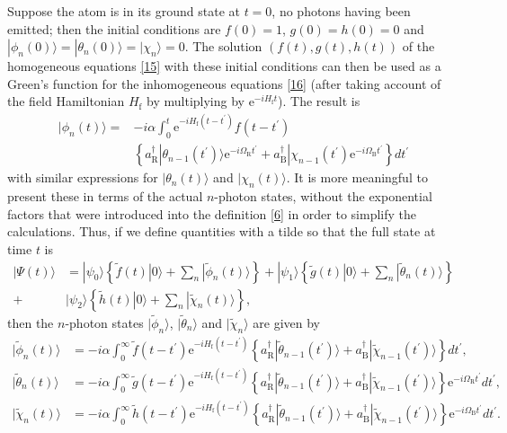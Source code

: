 \documentclass[12pt,a4paper,reqno]{article}
\renewcommand{\(}{\left(}
\renewcommand{\)}{\right)}
\newcommand{\pr}{^\prime}
\newcommand{\e}{\mbox{e}}
\newcommand{\tR}{\text{R}}
\newcommand{\tB}{\text{B}}
\newcommand{\tf}{\text{f}}
\newcommand{\<}{\langle}
\renewcommand{\>}{\rangle}
\theoremstyle{plain} %
\theoremstyle{definition}
\theoremstyle{remark}
\begin{document}
Suppose the atom is in its ground state at $t=0$, no photons having been
emitted; then the initial conditions are $f(0)=1$, $g(0)=h(0)=0$ and
$|\phi_n(0)\> = |\theta_n(0)\> = |\chi_n\> = 0$. The solution
$(f(t),g(t),h(t))$ of the homogeneous equations \eqref{15} with these
initial conditions can then be used as a Green's function for the
inhomogeneous equations \eqref{16} (after taking account of the field
Hamiltonian $H_{\tf}$ by multiplying by $\e^{-iH_{\tf}t}$). The result
is
\begin{equation}
\begin{aligned}\label{17}
|\phi_n(t)\> =& -i\alpha\int_0^t\e^{-iH_{\tf}(t-t\pr)}f(t-t\pr)\\
&\left\{a_{\tR}^\dagger|\theta_{n-1}(t\pr)\>\e^{-i\Omega_{\tR}t\pr}
+ a_{\tB}^\dagger|\chi_{n-1}(t\pr)\e^{-i\Omega_{\tB}t\pr}\right\}dt\pr
\end{aligned}
\end{equation}
with similar expressions for $|\theta_n(t)\>$ and $|\chi_n(t)\>$. It is
more meaningful to present these in terms of the actual $n$-photon
states, without the exponential factors that were introduced into the
definition \eqref{6} in order to simplify the calculations. Thus, if we
define quantities with a tilde so that the full state at time $t$ is 
\begin{equation}
\begin{aligned}
|\Psi(t)\> &=
|\psi_0\>\left\{\tilde{f}(t)|0\> + \sum_n|\tilde{\phi}_n(t)\>\right\} + 
|\psi_1\>\left\{\tilde{g}(t)|0\> + \sum_n|\tilde{\theta}_n(t)\>\right\}\\
+&|\psi_2\>\left\{\tilde{h}(t)|0\> + \sum_n|\tilde{\chi}_n(t)\>\right\},
\end{aligned}
\end{equation}
then the $n$-photon states $|\tilde{\phi}_n\>$, $|\tilde{\theta}_n\>$ and
$|\tilde{\chi}_n\>$ are given by
\begin{equation}
\begin{aligned}\label{19}
|\tilde{\phi}_n(t)\> &=
-i\alpha\int_0^\infty\tilde{f}(t-t\pr)\e^{-iH_{\tf}(t-t\pr)}
\left\{a_{\tR}^\dagger|\tilde{\theta}_{n-1}(t\pr)\> +
a_{\tB}^\dagger|\tilde{\chi}_{n-1}(t\pr)\>\right\}dt\pr,\\
|\tilde{\theta}_n(t)\> &=
-i\alpha\int_0^\infty\tilde{g}(t-t\pr)\e^{-iH_{\tf}(t-t\pr)}
\left\{a_{\tR}^\dagger|\tilde{\theta}_{n-1}(t\pr)\> +
a_{\tB}^\dagger|\tilde{\chi}_{n-1}(t\pr)\>\right\}\e^{-i\Omega_{\tR}t\pr}dt\pr,\\
|\tilde{\chi}_n(t)\> &=
-i\alpha\int_0^\infty\tilde{h}(t-t\pr)\e^{-iH_{\tf}(t-t\pr)}
\left\{a_{\tR}^\dagger|\tilde{\theta}_{n-1}(t\pr)\> +
a_{\tB}^\dagger|\tilde{\chi}_{n-1}(t\pr)\>\right\}\e^{-i\Omega_{\tB}t\pr}dt\pr.
\end{aligned}
\end{equation}
\end{document}

